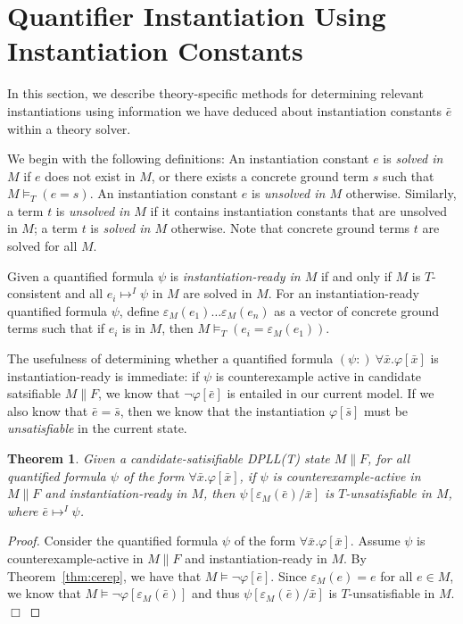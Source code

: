 \documentclass{llncs}
\newtheorem{thm}{Theorem}
\begin{document}
\section{Quantifier Instantiation Using Instantiation Constants}

In this section, we describe theory-specific methods for determining relevant instantiations using information we have deduced about instantiation constants $\bar{e}$ within a theory solver.

We begin with the following definitions:
An instantiation constant $e$ is \emph{solved in $M$} if $e$ does not exist in $M$, or there exists a concrete ground term $s$ such that $M \models_T (e = s)$.
An instantiation constant $e$ is \emph{unsolved in $M$} otherwise.
Similarly, a term $t$ is \emph{unsolved in $M$} if it contains instantiation constants that are unsolved in $M$; a term $t$ is \emph{solved in $M$} otherwise.
Note that concrete ground terms $t$ are solved for all $M$.

Given a quantified formula $\psi$ is \emph{instantiation-ready in $M$} if and only if $M$ is $T$-consistent and all $e_i \mapsto^I \psi$ in $M$ are solved in $M$.
For an instantiation-ready quantified formula $\psi$, define $\varepsilon_M( e_1 ) \ldots \varepsilon_M( e_n )$ as a vector of concrete ground terms such that if $e_i$ is in $M$, then $M \models_T (e_i = \varepsilon_M( e_1 ))$.

The usefulness of determining whether a quantified formula $(\psi:) \ \forall \bar{x}. \varphi[ \bar{x} ]$ is instantiation-ready is immediate:  if $\psi$ is counterexample active in candidate satsifiable $M \parallel F$, we know that $\neg \varphi[ \bar{e} ]$ is entailed in our current model.
If we also know that $\bar{e} = \bar{s}$, then we know that the instantiation $\varphi[ \bar{s} ]$ must be \emph{unsatisfiable} in the current state.

\begin{thm}
\label{thm:instready}
Given a candidate-satisifiable DPLL(T) state $M \parallel F$, for all quantified formula $\psi$ of the form $\forall \bar{x}. \varphi[ \bar{x} ]$, if $\psi$ is counterexample-active in $M \parallel F$ and instantiation-ready in $M$, then $\psi[\varepsilon_M( \bar{e} )/\bar{x}]$ is $T$-unsatisfiable in $M$, where $\bar{e} \mapsto^I \psi$.
\end{thm}
\begin{proof}
Consider the quantified formula $\psi$ of the form $\forall \bar{x}. \varphi[ \bar{x} ]$.
Assume $\psi$ is counterexample-active in $M \parallel F$ and instantiation-ready in $M$.
By Theorem~\ref{thm:cerep}, we have that $M \models \neg \varphi[\bar{e}]$.
Since $\varepsilon_{M}( e ) = e$ for all $e \in M$, we know that $M \models \neg \varphi[\varepsilon_M( \bar{e} )]$ and thus $\psi[\varepsilon_M( \bar{e} )/\bar{x}]$ is $T$-unsatisfiable in $M$. $\Box$
\end{proof}
\end{document}
